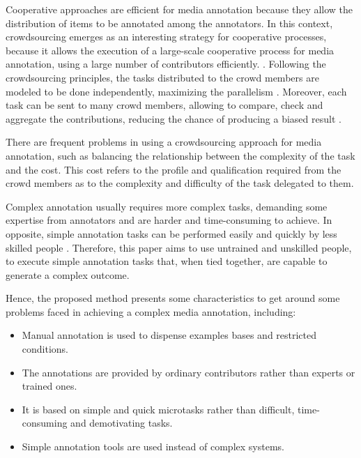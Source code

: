 Cooperative approaches are efficient for media annotation because they allow the distribution of items to be annotated among the annotators. In this context, crowdsourcing emerges as an interesting strategy for cooperative processes, because it allows the execution of a large-scale cooperative process for media annotation, using a large number of contributors efficiently. \cite{VonAhn:2005:HC:1168246}. Following the crowdsourcing principles, the tasks distributed to the crowd members are modeled to be done independently, maximizing the parallelism \citep{Howe2006}. Moreover, each task can be sent to many crowd members, allowing to compare, check and aggregate the contributions, reducing the chance of producing a biased result \cite{GALTON1907}.

There are frequent problems in using a crowdsourcing approach for media annotation, such as balancing the relationship between the complexity of the task and the cost. This cost refers to the profile and qualification required from the crowd members as to the complexity and difficulty of the task delegated to them.

\pagebreak

Complex annotation usually requires more complex tasks, demanding some expertise from annotators and are harder and time-consuming to achieve. In opposite, simple annotation tasks can be performed easily and quickly by less skilled people \cite{Difallah:2015:DMC:2736277.2741685}. Therefore, this paper aims to use untrained and unskilled people, to execute simple annotation tasks that, when tied together, are capable to generate a complex outcome.


Hence, the proposed method presents some characteristics to get around some problems faced in achieving a complex media annotation, including:


\begin{itemize}

\item Manual annotation is used to dispense examples bases and restricted conditions.

\item The annotations are provided by ordinary contributors rather than experts or trained ones.

\item It is based on simple and quick microtasks rather than difficult, time-consuming and demotivating tasks.

\item Simple annotation tools are used instead of complex systems.

\end{itemize}


